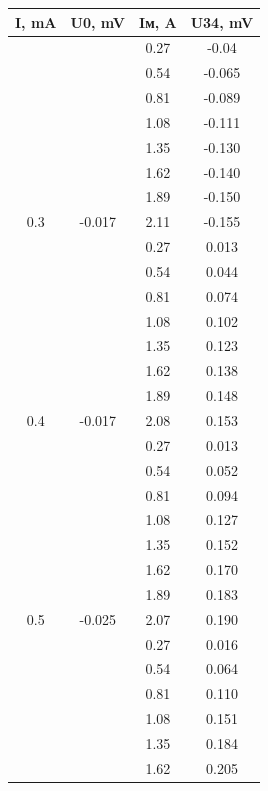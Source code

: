 \documentclass{article}
\begin{document}
\begin{figure}[H]
    \centering
    \begin{subfigure}{.5\textwidth}
    \centering
    \begin{tabular}{|c|c|c|c|}
        \hline
        I, mA & U0, mV & Iм, A & U34, mV \\\hline
        & & 0.27 & -0.04  \\
        & & 0.54 & -0.065 \\
        & & 0.81 & -0.089 \\
        & & 1.08 & -0.111 \\
        & & 1.35 & -0.130 \\
        & & 1.62 & -0.140 \\
        & & 1.89 & -0.150 \\
        \multirow{-8}{*}{0.3}         & \multirow{-8}{*}{-0.017}       & 2.11 & -0.155 \\\hline
        & & 0.27 & 0.013  \\
        & & 0.54 & 0.044  \\
        & & 0.81 & 0.074  \\
        & & 1.08 & 0.102  \\
        & & 1.35 & 0.123  \\
        & & 1.62 & 0.138  \\
        & & 1.89 & 0.148  \\
        \multirow{-8}{*}{0.4}         & \multirow{-8}{*}{-0.017}       & 2.08 & 0.153  \\\hline
        & & 0.27 & 0.013  \\
        & & 0.54 & 0.052  \\
        & & 0.81 & 0.094  \\
        & & 1.08 & 0.127  \\
        & & 1.35 & 0.152  \\
        & & 1.62 & 0.170  \\
        & & 1.89 & 0.183  \\
        \multirow{-8}{*}{0.5} & \multirow{-8}{*}{-0.025}       & 2.07 & 0.190  \\\hline
        & & 0.27 & 0.016  \\
        & & 0.54 & 0.064  \\
        & & 0.81 & 0.110  \\
        & & 1.08 & 0.151  \\
        & & 1.35 & 0.184  \\
        & & 1.62 & 0.205  \\

\end{tabular}
\end{subfigure}
\end{figure}
\end{document}
